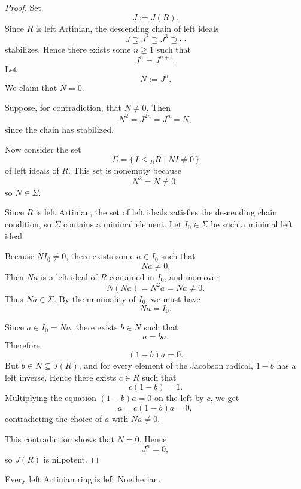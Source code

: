 \begin{proof}
    Set
    \[
        J:=J(R).
    \]
    Since $R$ is left Artinian, the descending chain of left ideals
    \[
        J \supseteq J^2 \supseteq J^3 \supseteq \cdots
    \]
    stabilizes. Hence there exists some $n \ge 1$ such that
    \[
        J^n = J^{n+1}.
    \]
    Let
    \[
        N:=J^n.
    \]
    We claim that $N=0$.

    Suppose, for contradiction, that $N \neq 0$. Then
    \[
        N^2 = J^{2n} = J^n = N,
    \]
    since the chain has stabilized.

    Now consider the set
    \[
        \Sigma=\{\, I \leq {}_R R \mid NI \neq 0 \,\}
    \]
    of left ideals of $R$. This set is nonempty because
    \[
        N^2 = N \neq 0,
    \]
    so $N \in \Sigma$.

    Since $R$ is left Artinian, the set of left ideals satisfies the descending chain
    condition, so $\Sigma$ contains a minimal element. Let $I_0 \in \Sigma$ be such a
    minimal left ideal.

    Because $NI_0 \neq 0$, there exists some $a \in I_0$ such that
    \[
        Na \neq 0.
    \]
    Then $Na$ is a left ideal of $R$ contained in $I_0$, and moreover
    \[
        N(Na)=N^2a=Na\neq 0.
    \]
    Thus $Na \in \Sigma$. By the minimality of $I_0$, we must have
    \[
        Na=I_0.
    \]

    Since $a \in I_0 = Na$, there exists $b \in N$ such that
    \[
        a=ba.
    \]
    Therefore
    \[
        (1-b)a=0.
    \]
    But $b \in N \subseteq J(R)$, and for every element of the Jacobson radical,
    $1-b$ has a left inverse. Hence there exists $c \in R$ such that
    \[
        c(1-b)=1.
    \]
    Multiplying the equation $(1-b)a=0$ on the left by $c$, we get
    \[
        a=c(1-b)a=0,
    \]
    contradicting the choice of $a$ with $Na \neq 0$.

    This contradiction shows that $N=0$. Hence
    \[
        J^n=0,
    \]
    so $J(R)$ is nilpotent.
\end{proof}

\begin{theorem}[Levitzki]
    Every left Artinian ring is left Noetherian.
\end{theorem}

